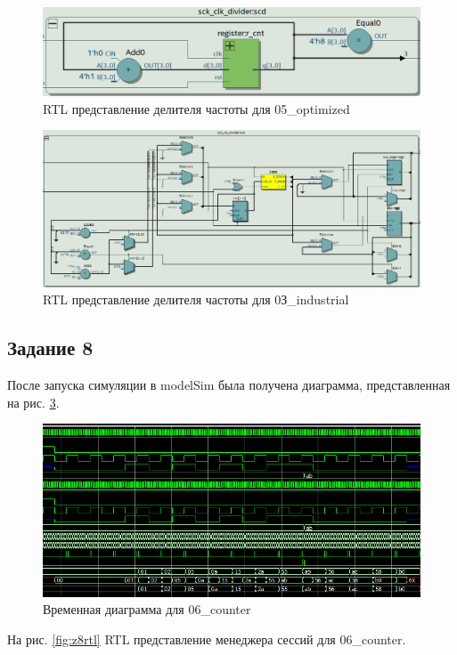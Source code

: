 \documentclass[a4paper,14pt]{article}
\begin{document}
	\begin{figure}[H]
		\centering
		\includegraphics[width=0.7\linewidth]{images/z6_trl_clk_div}
		\caption{RTL представление делителя частоты для 05\_optimized}
		\label{fig:z6trlclkdiv}
	\end{figure}

	\begin{figure}[H]
		\centering
		\includegraphics[width=0.7\linewidth]{images/z1_5_rtl_clk_divider}
		\caption{RTL представление делителя частоты для 0З\_industrial}
		\label{fig:z15rtlclkdivider1}
	\end{figure}
	
	\subsection{Задание 8}
	
	После запуска симуляции в modelSim была получена диаграмма, представленная на рис. \ref{fig:z8msimwvf}.
	
	\begin{figure}[H]
		\centering
		\includegraphics[width=0.9\linewidth]{images/z8_msim_wvf}
		\caption{Временная диаграмма для 06\_counter}
		\label{fig:z8msimwvf}
	\end{figure}
	
	На рис. \ref{fig:z8rtl} RTL представление менеджера сессий для 06\_counter.
	
\end{document}
